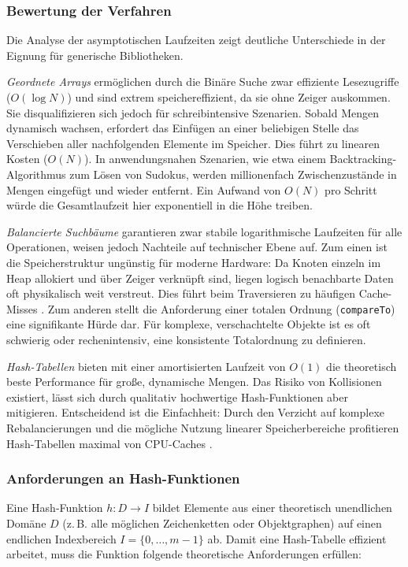 \subsubsection{Bewertung der Verfahren}

Die Analyse der asymptotischen Laufzeiten zeigt deutliche Unterschiede in der Eignung für generische Bibliotheken.

\emph{Geordnete Arrays} ermöglichen durch die Binäre Suche zwar effiziente Lesezugriffe ($O(\log N)$) und sind extrem speichereffizient, da sie ohne Zeiger auskommen. Sie disqualifizieren sich jedoch für schreibintensive Szenarien. Sobald Mengen dynamisch wachsen, erfordert das Einfügen an einer beliebigen Stelle das Verschieben aller nachfolgenden Elemente im Speicher. Dies führt zu linearen Kosten ($O(N)$).
In anwendungsnahen Szenarien, wie etwa einem Backtracking-Algorithmus zum Lösen von Sudokus, werden millionenfach Zwischenzustände in Mengen eingefügt und wieder entfernt. Ein Aufwand von $O(N)$ pro Schritt würde die Gesamtlaufzeit hier exponentiell in die Höhe treiben.

\emph{Balancierte Suchbäume} garantieren zwar stabile logarithmische Laufzeiten für alle Operationen, weisen jedoch Nachteile auf technischer Ebene auf. Zum einen ist die Speicherstruktur ungünstig für moderne Hardware: Da Knoten einzeln im Heap allokiert und über Zeiger verknüpft sind, liegen logisch benachbarte Daten oft physikalisch weit verstreut. Dies führt beim Traversieren zu häufigen Cache-Misses \autocite[S. 301]{cormen2022introduction}.
Zum anderen stellt die Anforderung einer totalen Ordnung (\texttt{compareTo}) eine signifikante Hürde dar. Für komplexe, verschachtelte Objekte ist es oft schwierig oder rechenintensiv, eine konsistente Totalordnung zu definieren.

\emph{Hash-Tabellen} bieten mit einer amortisierten Laufzeit von $O(1)$ die theoretisch beste Performance für große, dynamische Mengen. Das Risiko von Kollisionen existiert, lässt sich durch qualitativ hochwertige Hash-Funktionen aber mitigieren. Entscheidend ist die Einfachheit: Durch den Verzicht auf komplexe Rebalancierungen und die mögliche Nutzung linearer Speicherbereiche profitieren Hash-Tabellen maximal von CPU-Caches \autocite[S. 301]{cormen2022introduction}.

\subsubsection{Anforderungen an Hash-Funktionen}
Eine Hash-Funktion $h: D \rightarrow I$ bildet Elemente aus einer theoretisch unendlichen Domäne $D$ (z.\,B. alle möglichen Zeichenketten oder Objektgraphen) auf einen endlichen Indexbereich $I = \{0, \dots, m-1\}$ ab. Damit eine Hash-Tabelle effizient arbeitet, muss die Funktion folgende theoretische Anforderungen erfüllen:

